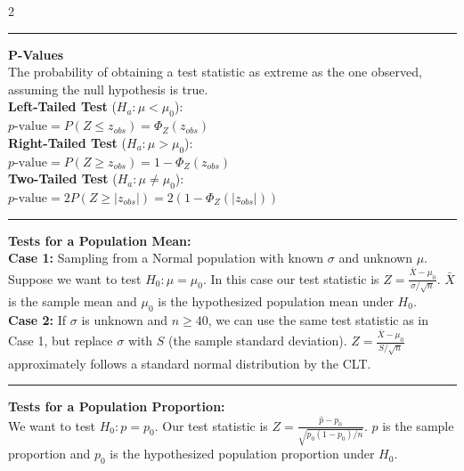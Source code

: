 \documentclass[10pt,letterpaper]{article}
\begin{document}
\begin{multicols}{2}
\vspace{0.1cm}
\hrule
\vspace{0.1cm}

\textbf{P-Values}\\
The probability of obtaining a test statistic as extreme as the one observed, assuming the null hypothesis is true.\\
\textbf{Left-Tailed Test} ($H_a: \mu < \mu_0$):\\
$p\text{-value} = P(Z \leq z_{obs}) = \Phi_Z(z_{obs})$\\
\textbf{Right-Tailed Test} ($H_a: \mu > \mu_0$):\\
$p\text{-value} = P(Z \geq z_{obs}) = 1 - \Phi_Z(z_{obs})$\\
\textbf{Two-Tailed Test} ($H_a: \mu \neq \mu_0$):\\
$p\text{-value} = 2P(Z \geq |z_{obs}|) = 2(1 - \Phi_Z(|z_{obs}|))$

\vspace{0.1cm}
\hrule
\vspace{0.1cm}

\textbf{Tests for a Population Mean:}\\
\textbf{Case 1:}
Sampling from a Normal population with known $\sigma$ and unknown $\mu$. Suppose we want to test $H_0 : \mu = \mu_0$. In this case our test
statistic is $Z = \frac{\bar{X} - \mu_0}{\sigma / \sqrt{n}}$. $\bar{X}$ is the sample mean and $\mu_0$ is the hypothesized population mean under $H_0$.\\
\textbf{Case 2:}
If $\sigma$ is unknown and $n \geq 40$, we can use the same test statistic as in Case 1, but replace $\sigma$ with $S$ (the sample standard deviation).
$Z = \frac{\bar{X} - \mu_0}{S / \sqrt{n}}$ approximately follows a standard normal distribution by the CLT.

\vspace{0.1cm}
\hrule
\vspace{0.1cm}

\textbf{Tests for a Population Proportion:}\\
We want to test $H_0 : p = p_0$. Our test statistic is $Z = \frac{\hat{p} - p_0}{\sqrt{p_0(1-p_0)/n}}$. $\hat{p}$ is the sample proportion and $p_0$ is the hypothesized population proportion under $H_0$.\\

\vspace{9999pt}

\end{multicols}
\end{document}
